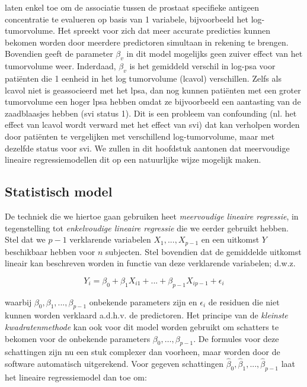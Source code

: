 \documentclass[
  12pt,dutch]{book}
\theoremstyle{definition}
\theoremstyle{definition}
\theoremstyle{definition}
\theoremstyle{definition}
\theoremstyle{remark}
\begin{document}
laten enkel toe om de associatie tussen de prostaat specifieke antigeen concentratie te evalueren op basis van 1 variabele, bijvoorbeeld het log-tumorvolume. Het spreekt voor zich dat meer accurate predicties kunnen bekomen worden door meerdere predictoren simultaan in rekening te brengen.
Bovendien geeft de parameter \(\beta_v\) in dit model mogelijks geen zuiver effect van het tumorvolume weer. Inderdaad, \(\beta_v\) is het gemiddeld verschil in log-psa voor patiënten die 1 eenheid in het log tumorvolume (lcavol) verschillen. Zelfs als lcavol niet is geassocieerd met het lpsa, dan nog kunnen patiënten met een groter tumorvolume een hoger lpsa hebben omdat ze bijvoorbeeld een aantasting van de zaadblaasjes hebben (svi status 1). Dit is een probleem van confounding (nl. het effect van lcavol wordt verward met het effect van svi) dat kan verholpen worden door patiënten te vergelijken met verschillend log-tumorvolume, maar met dezelfde status voor svi. We zullen in dit hoofdstuk aantonen dat meervoudige lineaire regressiemodellen dit op een natuurlijke wijze mogelijk maken.

\subsection{Statistisch model}\label{statistisch-model}

De techniek die we hiertoe gaan gebruiken heet \emph{meervoudige lineaire regressie}, in tegenstelling tot \emph{enkelvoudige lineaire regressie} die we eerder gebruikt hebben.
Stel dat we \(p-1\) verklarende variabelen \(X_1,...,X_{p-1}\) en een uitkomst \(Y\) beschikbaar hebben voor \(n\)
subjecten.
Stel bovendien dat de gemiddelde uitkomst lineair kan beschreven worden in functie van deze verklarende variabelen; d.w.z.

\[
Y_i =\beta_0 + \beta_1 X_{i1} + ... +\beta_{p-1} X_{ip-1} + \epsilon_i
\]

waarbij \(\beta_0,\beta_1,...,\beta_{p-1}\) onbekende parameters zijn en \(\epsilon_i\) de residuen die niet kunnen worden verklaard a.d.h.v. de predictoren.
Het principe van de \emph{kleinste kwadratenmethode} kan ook voor dit model worden gebruikt om schatters te bekomen voor de onbekende parameters
\(\beta_0, \ldots, \beta_{p-1}\).
De formules voor deze schattingen zijn nu een stuk complexer dan voorheen, maar worden door de software automatisch uitgerekend.
Voor gegeven
schattingen \(\hat{\beta}_0,\hat{\beta}_1,...,\hat{\beta}_{p-1}\) laat het lineaire
regressiemodel dan toe om:
\end{document}
